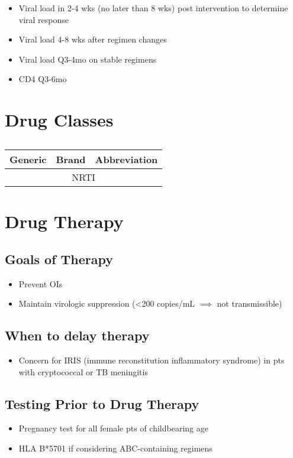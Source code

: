 \documentclass[main.tex]{subfiles}
\begin{document}
\begin{itemize}[noitemsep]
	\item Viral load in 2-4 wks (no later than 8 wks) post intervention to determine viral response
	\item Viral load 4-8 wks after regimen changes
	\item Viral load Q3-4mo on stable regimens
	\item CD4 Q3-6mo
\end{itemize}


\section{Drug Classes}

\begin{table}
	\centering
	\caption*{}
	\begin{tabular}{l l l}
		\textbf{Generic} & \textbf{Brand} & \textbf{Abbreviation} \\ \hline
		\multicolumn{3}{c}{NRTI} \\
		
	\end{tabular}

\end{table}

\section{Drug Therapy}

\subsection{Goals of Therapy}
\begin{itemize}[noitemsep]
	\item Prevent OIs
	\item Maintain virologic suppression (\textless 200 \si{copies/mL} $\implies$ not transmissible) 
\end{itemize}

\subsection{When to delay therapy}
\begin{itemize}[noitemsep]
	\item Concern for IRIS (immune reconstitution inflammatory syndrome) in pts with cryptococcal or TB meningitis
\end{itemize}

\subsection{Testing Prior to Drug Therapy}
\begin{itemize}[noitemsep]
	\item Pregnancy test for all female pts of childbearing age 
	\item HLA B*5701 if considering ABC-containing regimens
\end{itemize}
\end{document}
